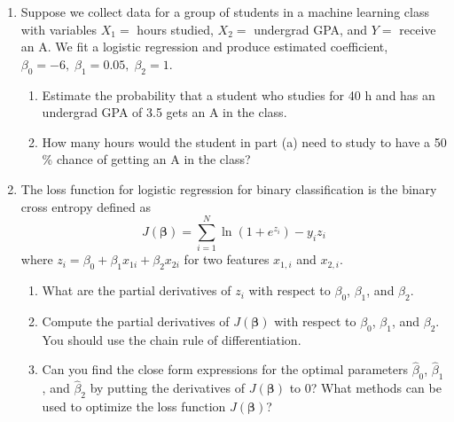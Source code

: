 \documentclass[11pt]{article}
\def\betabf{{\boldsymbol \beta}}
\begin{document}
\begin{enumerate}
\begin{enumerate}[(a)]
\end{enumerate}

\item Suppose we collect data for a group of students in a machine learning class
with variables $X_1 =$ hours studied, $X_2 =$ undergrad GPA, and $Y =$
receive an A. We fit a logistic regression and produce estimated
coefficient, $\beta_0 = -6, \;\beta_1 = 0.05,\; \beta_2 = 1$.

\begin{enumerate}
    \item  Estimate the probability that a student who studies for 40 h and
has an undergrad GPA of 3.5 gets an A in the class.


\item  How many hours would the student in part (a) need to study to
have a 50 \% chance of getting an A in the class?
\end{enumerate}

\item The loss function for logistic regression for binary classification is the binary cross entropy defined as $$J(\betabf)=\sum_{i=1}^N\ln(1+e^{z_i})-y_iz_i$$ where $z_i = \beta_0+\beta_1x_{1i}+\beta_2x_{2i}$ for two features $x_{1,i}$ and $x_{2,i}$.
\begin{enumerate}
    \item What are the partial derivatives of $z_i$ with respect to $\beta_0$, $\beta_1$, and $\beta_2$.
    \item Compute the partial derivatives of $J(\betabf)$ with respect to $\beta_0$, $\beta_1$, and $\beta_2$. You should use the chain rule of differentiation. 
    \item Can you find the close form expressions for the optimal parameters $\hat{\beta}_0$, $\hat{\beta}_1$, and $\hat{\beta}_2$ by putting the derivatives of $J(\betabf)$ to 0? What methods can be used to optimize the loss function $J(\betabf)$?
\end{enumerate}
\end{enumerate}
\end{document}
